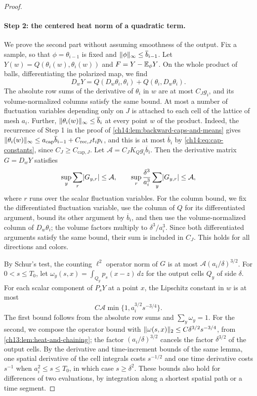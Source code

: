 \begin{proof}
\paragraph{Step 2: the centered heat norm of a quadratic term.}
We prove the second part without assuming smoothness of the output. Fix a sample, so that $\phi=\theta_{i-1}$ is fixed and $\lVert \phi\rVert_\infty\le\overline b_{i-1}$. Let $Y(w)=Q(\theta_i(w),\theta_i(w))$ and $F=Y-\mathbb E_\phi Y$. On the whole product of balls, differentiating the polarized map, we find
\[
 D_wY=Q(D_w\theta_i,\theta_i)+Q(\theta_i,D_w\theta_i).
\]
The absolute row sums of the derivative of $\theta_i$ in $w$ are at most $C_Jg_i$, and its volume-normalized columns satisfy the same bound. At most a number of fluctuation variables depending only on $J$ is attached to each cell of the lattice of mesh $a_i$. Further, $\lVert \theta_i(w)\rVert_\infty\le\overline b_i$ at every point $w$ of the product. Indeed, the recurrence of Step 1 in the proof of \cref{ch14:lem:backward-caps-and-means} gives $\lVert \theta_i(w)\rVert_\infty\le a_{\mathrm{cap}}\overline b_{i-1}+C_{\mathrm{rec},J}t_ip_i$, and this is at most $\overline b_i$ by \eqref{ch14:eq:cap-constants}, since $C_J\ge C_{\mathrm{cap},J}$. Let $\mathcal A=C_JK_Qg_i\overline b_i$. Then the derivative matrix $G=D_wY$ satisfies
\begin{equation}\label{ch14:eq:quadratic-jacobian}
 \sup_y\sum_r\lvert G_{y,r}\rvert\le\mathcal A,\qquad\sup_r\frac{\delta^3}{a_i^3}\sum_y\lvert G_{y,r}\rvert\le\mathcal A,
\end{equation}
where $r$ runs over the scalar fluctuation variables. For the column bound, we fix the differentiated fluctuation variable, use the column of $Q$ for its differentiated argument, bound its other argument by $\overline b_i$, and then use the volume-normalized column of $D_w\theta_i$; the volume factors multiply to $\delta^3/a_i^3$. Since both differentiated arguments satisfy the same bound, their sum is included in $C_J$. This holds for all directions and colors.

By Schur's test, the counting $\ell^2$ operator norm of $G$ is at most $\mathcal A(a_i/\delta)^{3/2}$. For $0<s\le T_0$, let $\omega_y(s,x)=\int_{Q_y}p_s(x-z)\,dz$ for the output cells $Q_y$ of side $\delta$. For each scalar component of $P_sY$ at a point $x$, the Lipschitz constant in $w$ is at most
\begin{equation}\label{ch14:eq:quadratic-heat-row}
 C\mathcal A\min\{1,a_i^{3/2}s^{-3/4}\}.
\end{equation}
The first bound follows from the absolute row sums and $\sum_y\omega_y=1$. For the second, we compose the operator bound with $\lVert \omega(s,x)\rVert_2\le C\delta^{3/2}s^{-3/4}$, from \cref{ch13:lem:heat-and-chaining}; the factor $(a_i/\delta)^{3/2}$ cancels the factor $\delta^{3/2}$ of the output cells. By the derivative and time-increment bounds of the same lemma, one spatial derivative of the cell integrals costs $s^{-1/2}$ and one time derivative costs $s^{-1}$ when $a_i^2\le s\le T_0$, in which case $s\ge\delta^2$. These bounds also hold for differences of two evaluations, by integration along a shortest spatial path or a time segment.


\end{proof}
